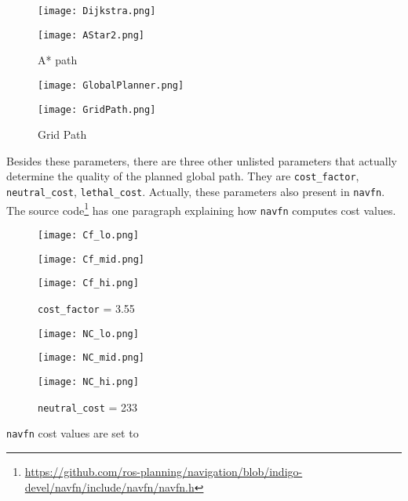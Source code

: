 \documentclass[12pt]{article}
\begin{document}
\begin{figure}[!htb]
  \texttt{[image: Dijkstra.png]}
  \caption{Dijkstra path}
\endminipage\hfill
{}
  \texttt{[image: AStar2.png]}
  \caption{A* path}
\endminipage\hfill
\end{figure}

\begin{figure}[!htb]
  \texttt{[image: GlobalPlanner.png]}
  \caption{Standard Behavior}
\endminipage\hfill
{}
  \texttt{[image: GridPath.png]}
  \caption{Grid Path}
\endminipage\hfill
\end{figure}


Besides these parameters, there are three other unlisted parameters that actually determine the quality of the planned
global path. They are \texttt{cost\_factor}, \texttt{neutral\_cost}, \texttt{lethal\_cost}. Actually, these parameters also present
in \texttt{navfn}. The source code\footnote{\scriptsize\url{https://github.com/ros-planning/navigation/blob/indigo-devel/navfn/include/navfn/navfn.h}} \normalsize has one paragraph explaining how \texttt{navfn} computes cost values.

\newpage

\begin{figure}[!htb]
  \texttt{[image: Cf\_lo.png]}
  \caption{\texttt{cost\_factor} = 0.01}
\endminipage\hfill
{}
    \texttt{[image: Cf\_mid.png]}
  \caption{\texttt{cost\_factor} = 0.55}
\endminipage\hfill
{}
  \texttt{[image: Cf\_hi.png]}
  \caption{\texttt{cost\_factor} = 3.55}
\endminipage\hfill
\end{figure}

\begin{figure}[!htb]
  \texttt{[image: NC\_lo.png]}
  \caption{\texttt{neutral\_cost} = 1}
\endminipage\hfill
{}
  \texttt{[image: NC\_mid.png]}
  \caption{\texttt{neutral\_cost} = 66}
\endminipage\hfill
{}
  \texttt{[image: NC\_hi.png]}
  \caption{\texttt{neutral\_cost} = 233}
\endminipage\hfill
\end{figure}

\newpage


\texttt{navfn} cost values are set to
\end{document}
